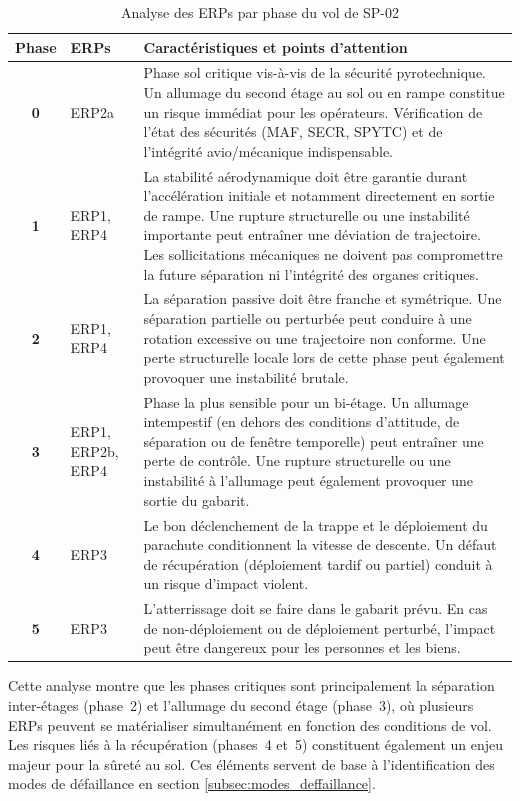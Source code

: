 \begin{table}[h!]
\centering
\begin{tabular}{|c|p{1.3cm}|p{12cm}|}
\hline
\textbf{Phase} &
\textbf{\acrshort{ERPs}} &
\textbf{Caractéristiques et points d’attention} \\ \hline

\textbf{0} &
ERP2a &
Phase sol critique vis-à-vis de la sécurité pyrotechnique. Un allumage du second étage au sol ou en rampe constitue un risque
immédiat pour les opérateurs. Vérification de l’état des sécurités (MAF, SECR, SPYTC) et de l’intégrité avio/mécanique
indispensable. 
\\ \hline

\textbf{1} &
ERP1, ERP4 &
La stabilité aérodynamique doit être garantie durant l’accélération initiale et notamment directement en sortie de rampe. Une
rupture structurelle ou une instabilité importante peut entraîner une déviation de trajectoire. Les sollicitations mécaniques ne
doivent pas compromettre la future séparation ni l’intégrité des organes critiques. 
\\ \hline

\textbf{2} &
ERP1, ERP4 &
La séparation passive doit être franche et symétrique. Une séparation partielle ou perturbée peut conduire à une rotation
excessive ou une trajectoire non conforme. Une perte structurelle locale lors de cette phase peut également provoquer une
instabilité brutale. 
\\ \hline

\textbf{3} &
ERP1, ERP2b, ERP4 &
Phase la plus sensible pour un bi-étage. Un allumage intempestif (en dehors des conditions d’attitude, de séparation ou de
fenêtre temporelle) peut entraîner une perte de contrôle. Une rupture structurelle ou une instabilité à l’allumage peut
également provoquer une sortie du gabarit. 
\\ \hline

\textbf{4} &
ERP3 &
Le bon déclenchement de la trappe et le déploiement du parachute conditionnent la vitesse de descente. Un défaut de récupération
(déploiement tardif ou partiel) conduit à un risque d’impact violent. 
\\ \hline

\textbf{5} &
ERP3 &
L’atterrissage doit se faire dans le gabarit prévu. En cas de non-déploiement ou de déploiement perturbé, l’impact peut être 
dangereux pour les personnes et les biens. 
\\ \hline

\end{tabular}
\caption{Analyse des \acrshort{ERPs} par phase du vol de SP-02}
\label{tab:ERP_par_phase}
\end{table}

Cette analyse montre que les phases critiques sont principalement la séparation inter-étages (phase~2) et l’allumage du second
étage (phase~3), où plusieurs \acrshort{ERPs} peuvent se matérialiser simultanément en fonction des conditions de vol. Les
risques liés à la récupération (phases~4 et~5) constituent également un enjeu majeur pour la sûreté au sol. Ces éléments servent
de base à l’identification des modes de défaillance en section \ref{subsec:modes_deffaillance}.

\newpage
